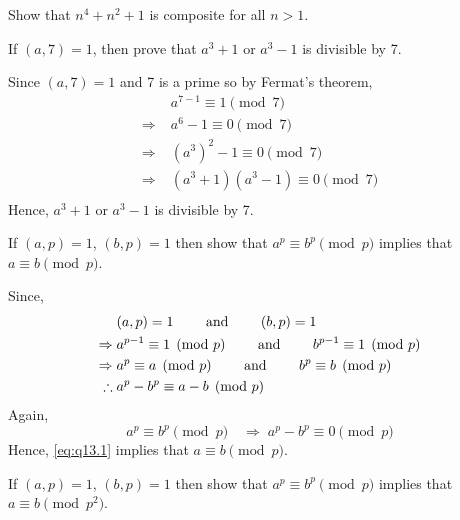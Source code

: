 \documentclass[12pt]{book}
\begin{document}
\begin{qn}
    Show that $ n^4+n^2+1 $ is composite for all $ n>1 $.
\end{qn}
\newpage
\begin{qn}
    If $ (a,7)=1 $, then prove that $ a^3+1$ or $a^3-1 $ is divisible by 7.
\end{qn}
\begin{soln}
    Since $ (a,7)=1 $ and 7 is a prime so by Fermat's theorem,
    \begin{align*}
        &a^{7-1}\equiv 1\pmod{7}\\
        \Rightarrow\;&a^6-1 \equiv 0\pmod{7}\\
        \Rightarrow\;&(a^3)^2-1 \equiv 0\pmod{7}\\
        \Rightarrow\;&(a^3+1)(a^3-1) \equiv 0\pmod{7}\\
    \end{align*}
    Hence, $ a^3+1$ or $a^3-1 $ is divisible by 7.
\end{soln}
\begin{qn}
    If $ (a,p)=1 $, $ (b,p)=1 $ then show that $ a^p\equiv b^p\pmod{p} $ implies that $ a\equiv b\pmod{p} $.
\end{qn}
\begin{soln}
    Since,
    \begin{align}
        &(a,p)=1\qquad \text{ and }\qquad (b,p)=1\notag\\
        \Rightarrow\;&a^{p-1}\equiv 1\pmod{p}\qquad \text{ and }\qquad b^{p-1}\equiv1\pmod{p}\notag\\
        \Rightarrow\;&a^{p}\equiv a\pmod{p}\qquad \text{ and }\qquad {b}^{p}\equiv b\pmod{p}\notag\\
        \therefore\;&a^{p}-b^p\equiv a-b\pmod{p}\label{eq:q13.1}
    \end{align}
    Again,
    \[
        a^p\equiv b^p\pmod{p}\quad \Rightarrow \; a^p-b^p\equiv 0 \pmod{p}
    \]
    Hence, \eqref{eq:q13.1} implies that $ a\equiv b\pmod{p} $.
\end{soln}
\begin{qn}
    If $ (a,p)=1 $, $ (b,p)=1 $ then show that $ a^p\equiv b^p\pmod{p} $ implies that $ a\equiv b\pmod{p^2} $.
\end{qn}
\end{document}
